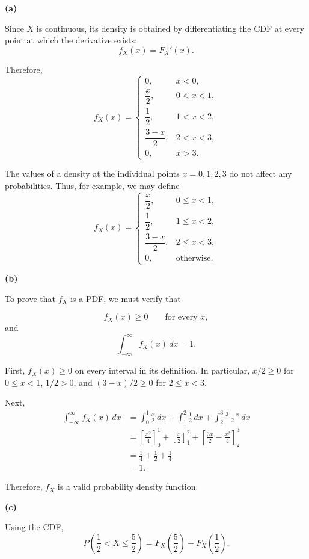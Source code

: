 \documentclass[11pt]{article}
\begin{document}
\begin{solutionbox}

\textbf{(a)}

Since $X$ is continuous, its density is obtained by differentiating the CDF
at every point at which the derivative exists:
\[
f_X(x)=F_X'(x).
\]

Therefore,
\[
f_X(x)=
\begin{cases}
0, & x<0,\\[1mm]
\dfrac{x}{2}, & 0<x<1,\\[2mm]
\dfrac12, & 1<x<2,\\[2mm]
\dfrac{3-x}{2}, & 2<x<3,\\[2mm]
0, & x>3.
\end{cases}
\]

The values of a density at the individual points $x=0,1,2,3$ do not affect
any probabilities. Thus, for example, we may define
\[
f_X(x)=
\begin{cases}
\dfrac{x}{2}, & 0\leq x<1,\\[2mm]
\dfrac12, & 1\leq x<2,\\[2mm]
\dfrac{3-x}{2}, & 2\leq x<3,\\[2mm]
0, & \text{otherwise}.
\end{cases}
\]

\textbf{(b)}

To prove that $f_X$ is a PDF, we must verify that

\[
f_X(x)\geq 0
\qquad\text{for every }x,
\]
and
\[
\int_{-\infty}^{\infty}f_X(x)\,dx=1.
\]

First, $f_X(x)\geq0$ on every interval in its definition. In particular,
$x/2\geq0$ for $0\leq x<1$, $1/2>0$, and
$(3-x)/2\geq0$ for $2\leq x<3$.

Next,
\begin{align*}
\int_{-\infty}^{\infty}f_X(x)\,dx
&=
\int_0^1\frac{x}{2}\,dx
+
\int_1^2\frac12\,dx
+
\int_2^3\frac{3-x}{2}\,dx\\
&=
\left[\frac{x^2}{4}\right]_0^1
+
\left[\frac{x}{2}\right]_1^2
+
\left[\frac{3x}{2}-\frac{x^2}{4}\right]_2^3\\
&=
\frac14+\frac12+\frac14\\
&=1.
\end{align*}

Therefore, $f_X$ is a valid probability density function.

\textbf{(c)}

Using the CDF,
\[
P\left(\frac12<X\leq\frac52\right)
=
F_X\left(\frac52\right)-F_X\left(\frac12\right).
\]


\end{solutionbox}
\end{document}
